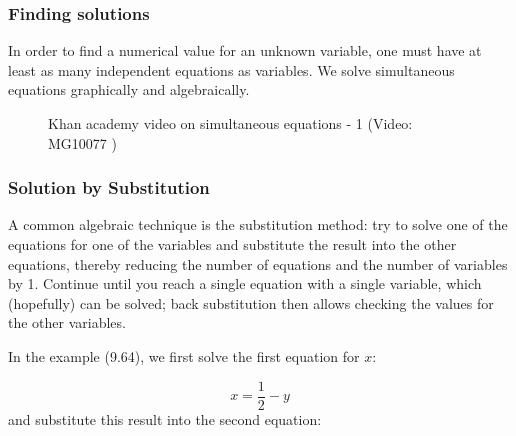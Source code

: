             \subsubsection{ Finding solutions}
            \nopagebreak
        \label{m39257*id159052}In order to find a numerical value for an unknown variable, one must have at least as many independent equations as variables. We solve simultaneous equations graphically and algebraically.\par \label{m39257*eip-487}
    \setcounter{subfigure}{0}
	\begin{figure}[H] %
    \textnormal{Khan academy video on simultaneous equations - 1}\vspace{.1in} \nopagebreak
  \label{m39257*yt-media7}\label{m39257*yt-video7}
             { (Video:  MG10077 )}
      \vspace{2pt}
    \vspace{.1in}
 \end{figure}       \par 
 \label{m39257*uid97}
            \subsubsection{ Solution by Substitution}
            \nopagebreak
        \label{m39257*id159786}A common algebraic technique is the substitution method: try to solve one of the equations for one of the variables and substitute the result into the other equations, thereby reducing the number of equations and the number of variables by 1. Continue until you reach a single equation with a single variable, which (hopefully) can be solved; back substitution then allows checking the values for the other variables.\par 
        \label{m39257*id159793}In the example (9.64), we first solve the first equation for $x$:\par 
        \label{m39257*id159811}\nopagebreak\noindent{}
          
    \begin{equation}
    x=\frac{1}{2}-y\tag{9.71}
      \end{equation}
        \label{m39257*id159835}and substitute this result into the second equation:\par 
        \label{m39257*id159838}\nopagebreak\noindent{}
          
